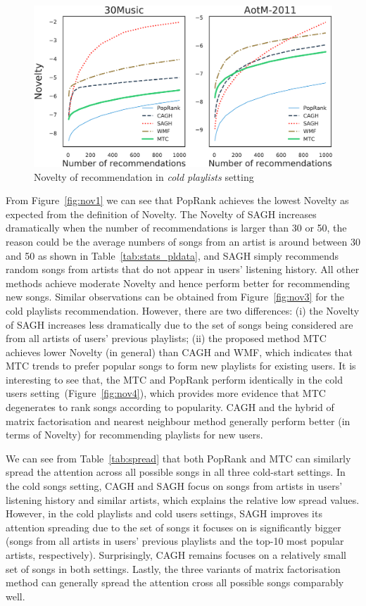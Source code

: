 \begin{figure}[!t]
    \centering
    \includegraphics[width=\columnwidth]{fig/nov3.pdf}
    \caption{Novelty of recommendation in \emph{cold playlists} setting}
\end{figure}



From Figure~\ref{fig:nov1} we can see that PopRank achieves the lowest Novelty as expected from the definition of Novelty.
The Novelty of SAGH increases dramatically when the number of recommendations is larger than 30 or 50, the reason could be the average 
numbers of songs from an artist is around between 30 and 50 as shown in Table~\ref{tab:stats_pldata}, and SAGH simply recommends random
songs from artists that do not appear in users' listening history.
All other methods achieve moderate Novelty and hence perform better for recommending new songs.
Similar observations can be obtained from Figure~\ref{fig:nov3} for the cold playlists recommendation.
However, there are two differences: (i) the Novelty of SAGH increases less dramatically due to the set of songs being considered are from
all artists of users' previous playlists; (ii) the proposed method MTC achieves lower Novelty (in general) than CAGH and WMF, which indicates
that MTC trends to prefer popular songs to form new playlists for existing users.
It is interesting to see that, the MTC and PopRank perform identically in the cold users setting~(Figure~\ref{fig:nov4}),
which provides more evidence that MTC degenerates to rank songs according to popularity.
CAGH and the hybrid of matrix factorisation and nearest neighbour method generally perform better (in terms of Novelty) for recommending 
playlists for new users.

We can see from Table~\ref{tab:spread} that both PopRank and MTC can similarly spread the attention across all possible songs in all three
cold-start settings. 
In the cold songs setting, CAGH and SAGH focus on songs from artists in users' listening history and similar artists, which explains 
the relative low spread values.
However, in the cold playlists and cold users settings, SAGH improves its attention spreading due to the set of songs it focuses on 
is significantly bigger (\ie songs from all artists in users' previous playlists and the top-10 most popular artists, respectively).
Surprisingly, CAGH remains focuses on a relatively small set of songs in both settings.
Lastly, the three variants of matrix factorisation method can generally spread the attention cross all possible songs comparably well.
